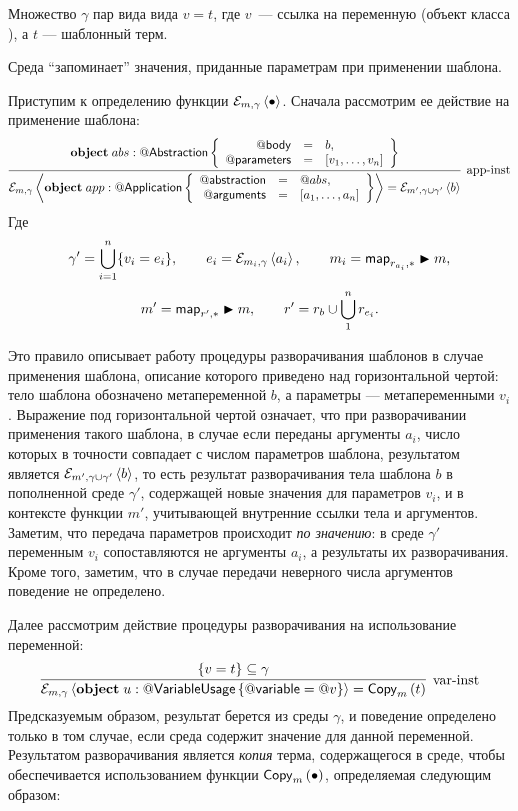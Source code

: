 \begin{Def}[Среда]
Множество $\gamma$ пар вида вида $v = t$, где $v$~--- ссылка на переменную (объект класса ), а $t$ --- шаблонный терм.
\end{Def}
Среда ``запоминает'' значения, приданные параметрам при применении шаблона.

Приступим к определению функции $\mathcal{E}_{m, \gamma} \left\langle \bullet \right\rangle$. Сначала рассмотрим ее действие на применение шаблона:
{\small
$$
\trule{
	\Object{abs}{\RefSt{Abstraction}}{
		\begin{array}{rcl}
			\RefSt{body} &=& b,\\
			\RefSt{parameters} &=& \List{v_1, \ldots, v_n}\\
		\end{array}	
	}
}{
	\Inst{\gamma}{
		\Object{app}{\RefSt{Application}}{
			\begin{array}{rcl}
				\RefSt{abstraction} &=& \Ref{abs},\\
				\RefSt{arguments} &=& \List{a_1, \ldots, a_n}
			\end{array}	
		}
	} = \InstC{m'}{\gamma \cup \gamma'}{b}
}{app-inst}
$$}
Где $$\gamma' = \bigcup\limits_{i=1}^{n} \{ v_i = e_i \}, \qquad e_i = 
\mathcal{E}_{m_i, \gamma} \left\langle a_i \right\rangle, \qquad m_i = \mathsf{map}_{r_{a_i}, *} \blacktriangleright m,
$$
$$m' = \mathsf{map}_{r', *} \blacktriangleright m, \qquad
r' = r_b \cup \bigcup\limits_{1}^{n} r_{e_i}.$$

Это правило описывает работу процедуры разворачивания шаблонов в случае применения шаблона, описание которого приведено над горизонтальной чертой: тело шаблона обозначено метапеременной $b$, а параметры --- метапеременными $v_i$. Выражение под горизонтальной чертой означает, что при разворачивании применения такого шаблона, в случае если переданы аргументы $a_i$, число которых в точности совпадает с числом параметров шаблона, результатом является $\mathcal{E}_{m', \gamma \cup \gamma'} \left\langle b \right\rangle$, то есть результат разворачивания тела шаблона $b$ в пополненной среде $\gamma'$, содержащей новые значения для параметров $v_i$, и в контексте функции $m'$, учитывающей внутренние ссылки тела и аргументов. Заметим, что передача параметров происходит \emph{по значению}: в среде $\gamma'$ переменным $v_i$ сопоставляются не аргументы $a_i$, а результаты их разворачивания. Кроме того, заметим, что в случае передачи неверного числа аргументов поведение не определено.

Далее рассмотрим действие процедуры разворачивания на использование переменной:
$$
\trule{
	\{v = t\} \subseteq \gamma
}{
	\Inst{\gamma}{\Object{u}{\RefSt{VariableUsage}}{\RefSt{variable} = \Ref{v}}} = \Copy{t}
}{var-inst}
$$ 
Предсказуемым образом, результат берется из среды $\gamma$, и поведение определено только в том случае, если среда содержит значение для данной переменной. Результатом разворачивания является \emph{копия} терма, содержащегося в среде, чтобы обеспечивается использованием функции $\mathsf{Copy}_{m}\left(\bullet\right)$, определяемая следующим образом:

